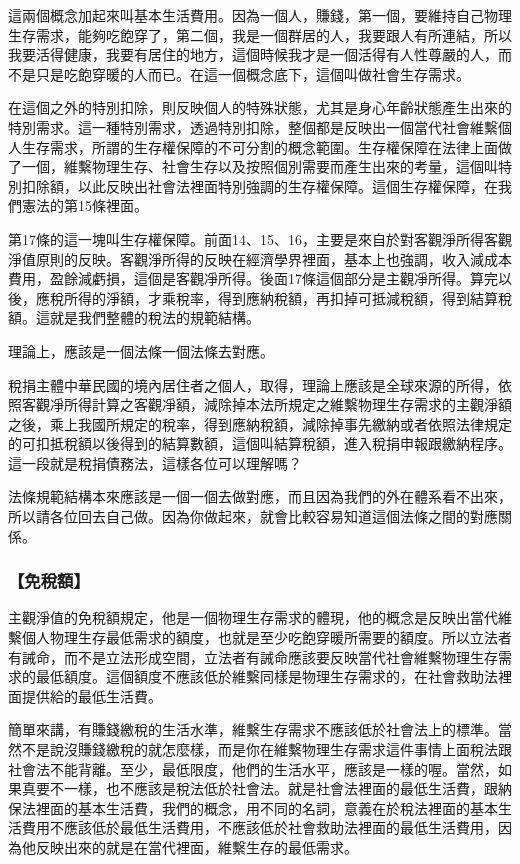 \documentclass[oneside,sub3section]{ctexbook}
\begin{document}
這兩個概念加起來叫基本生活費用。因為一個人，賺錢，第一個，要維持自己物理生存需求，能夠吃飽穿了，第二個，我是一個群居的人，我要跟人有所連結，所以我要活得健康，我要有居住的地方，這個時候我才是一個活得有人性尊嚴的人，而不是只是吃飽穿暖的人而已。在這一個概念底下，這個叫做社會生存需求。

在這個之外的特別扣除，則反映個人的特殊狀態，尤其是身心年齡狀態產生出來的特別需求。這一種特別需求，透過特別扣除，整個都是反映出一個當代社會維繫個人生存需求，所謂的生存權保障的不可分割的概念範圍。生存權保障在法律上面做了一個，維繫物理生存、社會生存以及按照個別需要而產生出來的考量，這個叫特別扣除額，以此反映出社會法裡面特別強調的生存權保障。這個生存權保障，在我們憲法的第15條裡面。

第17條的這一塊叫生存權保障。前面14、15、16，主要是來自於對客觀淨所得客觀淨值原則的反映。客觀淨所得的反映在經濟學界裡面，基本上也強調，收入減成本費用，盈餘減虧損，這個是客觀凈所得。後面17條這個部分是主觀凈所得。算完以後，應稅所得的淨額，才乘稅率，得到應納稅額，再扣掉可抵減稅額，得到結算稅額。這就是我們整體的稅法的規範結構。

理論上，應該是一個法條一個法條去對應。

稅捐主體中華民國的境內居住者之個人，取得，理論上應該是全球來源的所得，依照客觀凈所得計算之客觀凈額，減除掉本法所規定之維繫物理生存需求的主觀淨額之後，乘上我國所規定的稅率，得到應納稅額，減除掉事先繳納或者依照法律規定的可扣抵稅額以後得到的結算數額，這個叫結算稅額，進入稅捐申報跟繳納程序。這一段就是稅捐債務法，這樣各位可以理解嗎？

法條規範結構本來應該是一個一個去做對應，而且因為我們的外在體系看不出來，所以請各位回去自己做。因為你做起來，就會比較容易知道這個法條之間的對應關係。

\hypertarget{ux514dux7a05ux984d}{%
\subsubsection{【免稅額】}\label{ux514dux7a05ux984d}}

主觀淨值的免稅額規定，他是一個物理生存需求的體現，他的概念是反映出當代維繫個人物理生存最低需求的額度，也就是至少吃飽穿暖所需要的額度。所以立法者有誡命，而不是立法形成空間，立法者有誡命應該要反映當代社會維繫物理生存需求的最低額度。這個額度不應該低於維繫同樣是物理生存需求的，在社會救助法裡面提供給的最低生活費。

簡單來講，有賺錢繳稅的生活水準，維繫生存需求不應該低於社會法上的標準。當然不是說沒賺錢繳稅的就怎麼樣，而是你在維繫物理生存需求這件事情上面稅法跟社會法不能背離。至少，最低限度，他們的生活水平，應該是一樣的喔。當然，如果真要不一樣，也不應該是稅法低於社會法。就是社會法裡面的最低生活費，跟納保法裡面的基本生活費，我們的概念，用不同的名詞，意義在於稅法裡面的基本生活費用不應該低於最低生活費用，不應該低於社會救助法裡面的最低生活費用，因為他反映出來的就是在當代裡面，維繫生存的最低需求。
\end{document}
